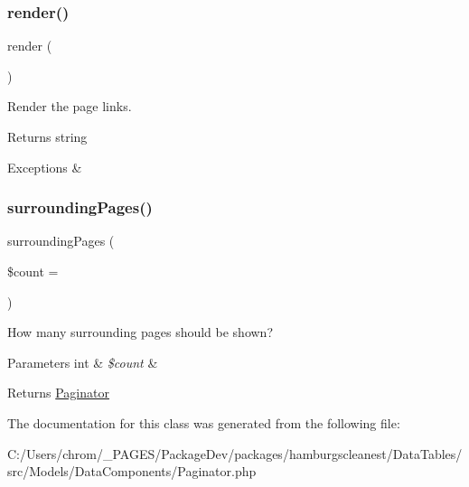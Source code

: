 \subsubsection{\texorpdfstring{render()}{render()}}
{\footnotesize\ttfamily render (\begin{DoxyParamCaption}{ }\end{DoxyParamCaption})}

Render the page links.

\begin{DoxyReturn}{Returns}
string 
\end{DoxyReturn}

\begin{DoxyExceptions}{Exceptions}
{\em } & \\
\hline
\end{DoxyExceptions}
\mbox{\label{classhamburgscleanest_1_1_data_tables_1_1_models_1_1_data_components_1_1_paginator_ab4a99d48dee7f0f1202d66439dbc0c5b}} 
\subsubsection{\texorpdfstring{surrounding\+Pages()}{surroundingPages()}}
{\footnotesize\ttfamily surrounding\+Pages (\begin{DoxyParamCaption}\item[{}]{\$count = {} }\end{DoxyParamCaption})}

How many surrounding pages should be shown?


\begin{DoxyParams}[1]{Parameters}
int & {\em \$count} & \\
\hline
\end{DoxyParams}
\begin{DoxyReturn}{Returns}
\hyperlink{classhamburgscleanest_1_1_data_tables_1_1_models_1_1_data_components_1_1_paginator}{Paginator} 
\end{DoxyReturn}


The documentation for this class was generated from the following file\+:\begin{DoxyCompactItemize}
\item 
C\+:/\+Users/chrom/\+\_\+\+P\+A\+G\+E\+S/\+Package\+Dev/packages/hamburgscleanest/\+Data\+Tables/src/\+Models/\+Data\+Components/Paginator.\+php\end{DoxyCompactItemize}
